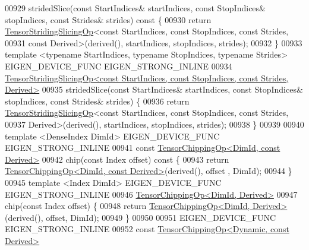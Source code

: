 \begin{DoxyCode}
00929     stridedSlice(\textcolor{keyword}{const} StartIndices& startIndices, \textcolor{keyword}{const} StopIndices& stopIndices, \textcolor{keyword}{const} Strides& strides)\textcolor{keyword}{
       const }\{
00930       \textcolor{keywordflow}{return} \hyperlink{class_eigen_1_1_tensor_striding_slicing_op}{TensorStridingSlicingOp}<\textcolor{keyword}{const} StartIndices, \textcolor{keyword}{const} StopIndices, \textcolor{keyword}{const} 
      Strides,
00931                                 \textcolor{keyword}{const} Derived>(derived(), startIndices, stopIndices, strides);
00932     \}
00933     \textcolor{keyword}{template} <\textcolor{keyword}{typename} StartIndices, \textcolor{keyword}{typename} StopIndices, \textcolor{keyword}{typename} Str\textcolor{keywordtype}{id}es> EIGEN\_DEVICE\_FUNC 
      EIGEN\_STRONG\_INLINE
00934     
      \hyperlink{class_eigen_1_1_tensor_striding_slicing_op}{TensorStridingSlicingOp<const StartIndices, const StopIndices, const Strides, Derived>}
00935     stridedSlice(\textcolor{keyword}{const} StartIndices& startIndices, \textcolor{keyword}{const} StopIndices& stopIndices, \textcolor{keyword}{const} Strides& strides) 
      \{
00936       \textcolor{keywordflow}{return} \hyperlink{class_eigen_1_1_tensor_striding_slicing_op}{TensorStridingSlicingOp}<\textcolor{keyword}{const} StartIndices, \textcolor{keyword}{const} StopIndices, \textcolor{keyword}{const} 
      Strides,
00937                                 Derived>(derived(), startIndices, stopIndices, strides);
00938     \}
00939 
00940     \textcolor{keyword}{template} <DenseIndex DimId> EIGEN\_DEVICE\_FUNC EIGEN\_STRONG\_INLINE
00941     \textcolor{keyword}{const} \hyperlink{class_eigen_1_1_tensor_chipping_op}{TensorChippingOp<DimId, const Derived>}
00942     chip(\textcolor{keyword}{const} Index offset)\textcolor{keyword}{ const }\{
00943       \textcolor{keywordflow}{return} \hyperlink{class_eigen_1_1_tensor_chipping_op}{TensorChippingOp<DimId, const Derived>}(derived(), offset
      , DimId);
00944     \}
00945     \textcolor{keyword}{template} <Index DimId> EIGEN\_DEVICE\_FUNC EIGEN\_STRONG\_INLINE
00946     \hyperlink{class_eigen_1_1_tensor_chipping_op}{TensorChippingOp<DimId, Derived>}
00947     chip(\textcolor{keyword}{const} Index offset) \{
00948       \textcolor{keywordflow}{return} \hyperlink{class_eigen_1_1_tensor_chipping_op}{TensorChippingOp<DimId, Derived>}(derived(), offset, DimId);
00949     \}
00950 
00951     EIGEN\_DEVICE\_FUNC EIGEN\_STRONG\_INLINE
00952     \textcolor{keyword}{const} \hyperlink{class_eigen_1_1_tensor_chipping_op}{TensorChippingOp<Dynamic, const Derived>}

\end{DoxyCode}
